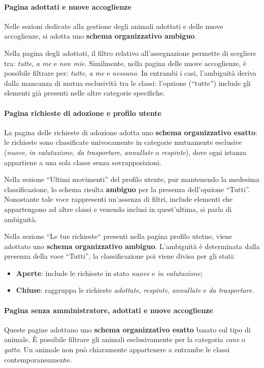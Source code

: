 \paragraph{Pagina adottati e nuove accoglienze}
Nelle sezioni dedicate alla gestione degli animali adottati e delle nuove accoglienze, si adotta uno \textbf{schema organizzativo ambiguo}. 

Nella pagina degli adottati, il filtro relativo all'assegnazione permette di scegliere tra: \textit{tutte}, \textit{a me} e \textit{non mie}. 
Similmente, nella pagina delle nuove accoglienze, è possibile filtrare per: \textit{tutte}, \textit{a me} e \textit{nessuno}. 
In entrambi i casi, l'ambiguità deriva dalla mancanza di mutua esclusività tra le classi: l'opzione (``tutte'') include gli elementi 
già presenti nelle altre categorie specifiche.

\paragraph{Pagina richieste di adozione e profilo utente}
La pagina delle richieste di adozione adotta uno \textbf{schema organizzativo esatto}: le richieste sono classificate univocamente in categorie mutuamente 
esclusive (\textit{nuove}, \textit{in valutazione}, \textit{da trasportare}, \textit{annullate} o \textit{respinte}), dove ogni istanza appartiene a 
una sola classe senza sovrapposizioni.

Nella sezione ``Ultimi movimenti'' del profilo utente, pur mantenendo la medesima classificazione, lo schema risulta \textbf{ambiguo} per la presenza 
dell'opzione ``Tutti''. Nonostante tale voce rappresenti un'assenza di filtri, include elementi che appartengono ad altre classi e venendo inclusi in quest'ultima, si parla di ambiguità.

Nella sezione ``Le tue richieste`` presenti nella pagina profilo utetne, viene adottato uno \textbf{schema organizzativo ambiguo}. L'ambiguità è determinata dalla presenza 
della voce ``Tutti'', la classificazione poi viene divisa per gli stati:
\begin{itemize}
    \item \textbf{Aperte}: include le richieste in stato \textit{nuove} e \textit{in valutazione};
    \item \textbf{Chiuse}: raggruppa le richieste \textit{adottate}, \textit{respinte}, \textit{annullate} e \textit{da trasportare}.
\end{itemize}

\paragraph{Pagina senza amministratore, adottati e nuove accoglienze}
Queste pagine adottano uno \textbf{schema organizzativo esatto} basato sul tipo di animale. È possibile filtrare gli animali esclusivamente per la 
categoria \textit{cane} o \textit{gatto}. Un animale non può chiaramente appartenere a entrambe le classi contemporaneamente.


